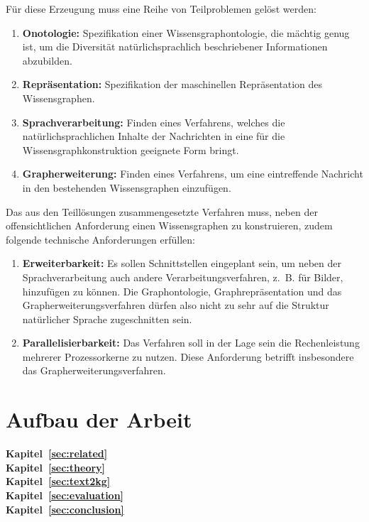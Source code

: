 Für diese Erzeugung muss eine Reihe von Teilproblemen gelöst werden:
\begin{enumerate}
	\item \textbf{Onotologie:}
		Spezifikation einer Wissensgraphontologie, die mächtig genug ist, um die Diversität natürlichsprachlich beschriebener Informationen abzubilden.
	\item \textbf{Repräsentation:}
		Spezifikation der maschinellen Repräsentation des Wissensgraphen.
	\item \textbf{Sprachverarbeitung:}
		Finden eines Verfahrens, welches die natürlichsprachlichen Inhalte der Nachrichten in eine für die Wissensgraphkonstruktion geeignete Form bringt.
	\item \textbf{Grapherweiterung:}
		Finden eines Verfahrens, um eine eintreffende Nachricht in den bestehenden Wissensgraphen einzufügen.
\end{enumerate}

Das aus den Teillösungen zusammengesetzte Verfahren muss, neben der offensichtlichen Anforderung einen Wissensgraphen zu konstruieren, zudem folgende technische Anforderungen erfüllen:
\begin{enumerate}
	\item \textbf{Erweiterbarkeit:}
		Es sollen Schnittstellen eingeplant sein, um neben der Sprachverarbeitung auch andere Verarbeitungsverfahren, z.~B. für Bilder, hinzufügen zu können.
		Die Graphontologie, Graphrepräsentation und das Grapherweiterungsverfahren dürfen also nicht zu sehr auf die Struktur natürlicher Sprache zugeschnitten sein.
	\item \textbf{Parallelisierbarkeit:}
		Das Verfahren soll in der Lage sein die Rechenleistung mehrerer Prozessorkerne zu nutzen.
		Diese Anforderung betrifft insbesondere das Grapherweiterungsverfahren.
\end{enumerate}

\section{Aufbau der Arbeit}
\label{sec:intro:structure}

\textbf{Kapitel~\ref{sec:related}} \\[0.2em]

\textbf{Kapitel~\ref{sec:theory}} \\[0.2em]

\textbf{Kapitel~\ref{sec:text2kg}} \\[0.2em]

\textbf{Kapitel~\ref{sec:evaluation}} \\[0.2em]

\textbf{Kapitel~\ref{sec:conclusion}} \\[0.2em]
